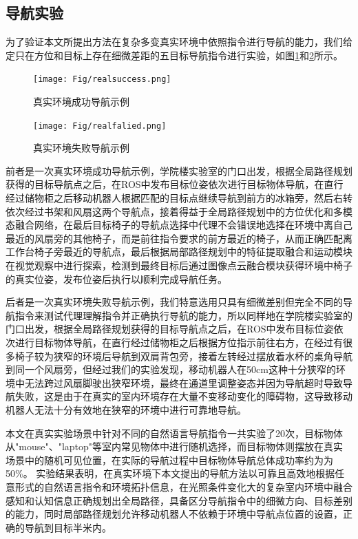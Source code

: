 \subsection{导航实验}
为了验证本文所提出方法在复杂多变真实环境中依照指令进行导航的能力，我们给定只在方位和目标上存在细微差距的五目标导航指令进行实验，如图\ref{realenvsuccess}和\ref{realenvfalied}所示。
\begin{figure}[htbp]
    \centering
    \texttt{[image: Fig/realsuccess.png]}
    \caption{\label{realenvsuccess}真实环境成功导航示例}
\end{figure}

\begin{figure}[htbp]
    \centering
    \texttt{[image: Fig/realfalied.png]}
    \caption{\label{realenvfalied}真实环境失败导航示例}
\end{figure}

前者是一次真实环境成功导航示例，学院楼实验室的门口出发，根据全局路径规划获得的目标导航点之后，在ROS中发布目标位姿依次进行目标物体导航，在直行经过储物柜之后移动机器人根据匹配的目标点继续导航到前方的冰箱旁，然后右转依次经过书架和风扇这两个导航点，接着得益于全局路径规划中的方位优化和多模态融合网络，在最后目标椅子的导航点选择中代理不会错误地选择在环境中离自己最近的风扇旁的其他椅子，而是前往指令要求的前方最近的椅子，从而正确匹配离工作台椅子旁最近的导航点，最后根据局部路径规划中的特征提取融合和运动模块在视觉观察中进行探索，检测到最终目标后通过图像点云融合模块获得环境中椅子的真实位姿，发布位姿后执行以顺利完成导航任务。

后者是一次真实环境失败导航示例，我们特意选用只具有细微差别但完全不同的导航指令来测试代理理解指令并正确执行导航的能力，所以同样地在学院楼实验室的门口出发，根据全局路径规划获得的目标导航点之后，在ROS中发布目标位姿依次进行目标物体导航，在直行经过储物柜之后根据方位指示前往右方，在经过有很多椅子较为狭窄的环境后导航到双肩背包旁，接着左转经过摆放着水杯的桌角导航到同一个风扇旁，但经过我们的实验发现，移动机器人在50cm这种十分狭窄的环境中无法跨过风扇脚驶出狭窄环境，最终在通道里调整姿态并因为导航超时导致导航失败，这是由于在真实的室内环境存在大量不变移动变化的障碍物，这导致移动机器人无法十分有效地在狭窄的环境中进行可靠地导航。



本文在真实实验场景中针对不同的自然语言导航指令一共实验了20次，目标物体从"mouse"、"laptop"等室内常见物体中进行随机选择，而目标物体则摆放在真实场景中的随机可见位置，在实际的导航过程中目标物体导航总体成功率约为为50\%。
实验结果表明，在真实环境下本文提出的导航方法以可靠且高效地根据任意形式的自然语言指令和环境拓扑信息，在光照条件变化大的复杂室内环境中融合感知和认知信息正确规划出全局路径，具备区分导航指令中的细微方向、目标差别的能力，同时局部路径规划允许移动机器人不依赖于环境中导航点位置的设置，正确的导航到目标半米内。

